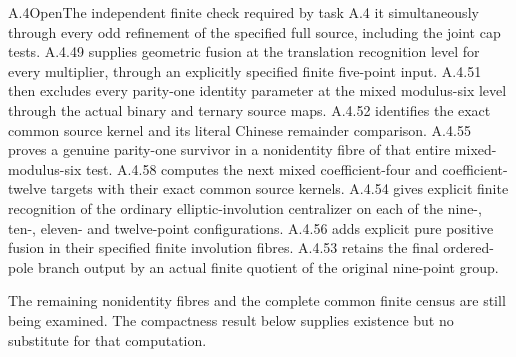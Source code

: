 \begin{result}{A.4}{Open}{The independent finite check required by task A.4}
it simultaneously through every odd refinement of the
specified full source, including the joint cap tests.
A.4.49 supplies geometric fusion at the translation
recognition level for every multiplier, through an explicitly
specified finite five-point input. A.4.51 then excludes every parity-one identity parameter
at the mixed modulus-six level through the actual binary
and ternary source maps. A.4.52 identifies the exact
common source kernel and its literal Chinese remainder
comparison. A.4.55 proves a genuine parity-one survivor
in a nonidentity fibre of that entire mixed-modulus-six test.
A.4.58 computes the next mixed coefficient-four and coefficient-twelve
targets with their exact common source kernels.
 A.4.54 gives explicit finite recognition of
the ordinary elliptic-involution centralizer on each of
the nine-, ten-, eleven- and twelve-point configurations. A.4.56
adds explicit pure positive fusion in their specified finite involution
fibres. A.4.53 retains the final ordered-pole branch output by an
actual finite quotient of the original nine-point group.

 The remaining nonidentity fibres
and the complete common finite census are still being
examined. The compactness result below supplies existence
but no substitute for that computation.
\end{result}

